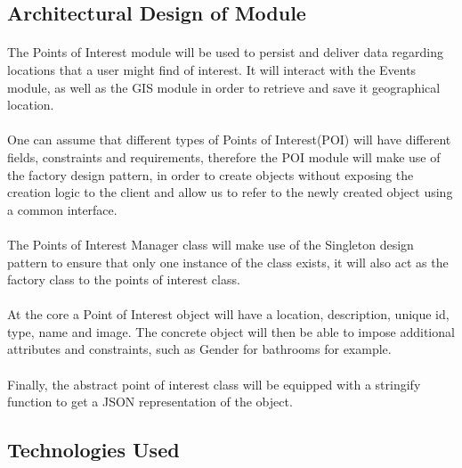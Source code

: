 \subsection{Architectural Design of Module}

\paragraph{}The Points of Interest module will be used to persist and deliver data regarding locations that a user 
might find of interest. It will interact with the Events module, as well as the GIS module in order to retrieve and 
save it geographical location.

\paragraph{}One can assume that different types of Points of Interest(POI) will have different fields, constraints 
and requirements, therefore the POI module will make use of the factory design pattern, in order to create objects 
without exposing the creation logic to the client and allow us to refer to the newly created object using a common interface.

\paragraph{}The Points of Interest Manager class will make use of the Singleton design pattern to ensure that only one 
instance of the class exists, it will also act as the factory class to the points of interest class.

\paragraph{}At the core a Point of Interest object will have a location, description, unique id, type, name and image. 
The concrete object will then be able to impose additional attributes and constraints, such as Gender for bathrooms for 
example.

\paragraph{}Finally, the abstract point of interest class will be equipped with a stringify function to get a JSON 
representation of the object. 

\subsection{Technologies Used}

